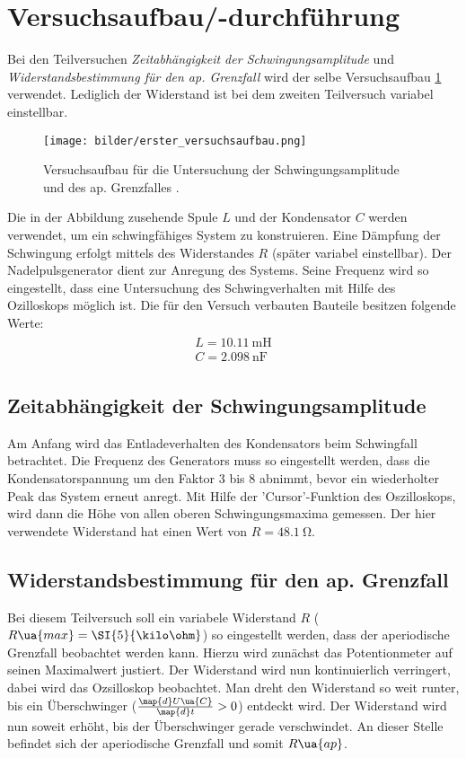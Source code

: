 \section{Versuchsaufbau/-durchführung}
Bei den Teilversuchen \emph{Zeitabhängigkeit der Schwingungsamplitude}
und \emph{Widerstandsbestimmung für den ap. Grenzfall} wird der selbe
Versuchsaufbau \ref{fig:aufbau_eins} verwendet. Lediglich der Widerstand ist bei dem
zweiten Teilversuch variabel einstellbar.
\begin{figure}
  \centering
  \texttt{[image: bilder/erster\_versuchsaufbau.png]}
  \caption{Versuchsaufbau für die Untersuchung der Schwingungsamplitude und des ap. Grenzfalles \cite{anleitung354}. }
  \label{fig:aufbau_eins}
\end{figure}
Die in der Abbildung zusehende Spule $L$ und der Kondensator $C$ werden verwendet, um
ein schwingfähiges System zu konstruieren. Eine Dämpfung der Schwingung
erfolgt mittels des Widerstandes $R$ (später variabel einstellbar).
Der Nadelpulsgenerator dient zur Anregung des Systems. Seine Frequenz wird so
eingestellt, dass eine Untersuchung des Schwingverhalten mit Hilfe des
Ozilloskops möglich ist. Die für den Versuch verbauten Bauteile besitzen folgende
Werte:
\begin{align}
  \label{eq:bauelemente_1}
  \begin{aligned}
    L=\SI{10.11}{\milli\henry}\\
    C=\SI{2.098}{\nano\farad}
  \end{aligned}
\end{align}
\subsection{Zeitabhängigkeit der Schwingungsamplitude}
Am Anfang wird das Entladeverhalten des Kondensators beim Schwingfall betrachtet.
Die Frequenz des Generators muss %
so eingestellt werden, dass die Kondensatorspannung um den Faktor $3$ bis $8$
abnimmt, bevor ein wiederholter Peak das System erneut anregt.
Mit Hilfe der 'Cursor'-Funktion des Oszilloskops, wird dann %
die Höhe von allen oberen Schwingungsmaxima gemessen.
Der hier verwendete Widerstand hat einen Wert von $R=\SI{48.1}{\ohm}$.
\subsection{Widerstandsbestimmung für den ap. Grenzfall}
Bei diesem Teilversuch soll ein variabele Widerstand $R$ ($R\ua{max}=\SI{5}{\kilo\ohm}$) so eingestellt werden,
dass der aperiodische Grenzfall beobachtet werden kann.
Hierzu wird zunächst das Potentionmeter auf seinen Maximalwert justiert.
Der Widerstand wird nun kontinuierlich verringert, dabei wird das %
Ozsilloskop beobachtet. Man dreht den Widerstand so weit runter, bis %
ein Überschwinger ($\frac{\map{d}U\ua{C}}{\map{d}t}>0$) entdeckt wird.
Der Widerstand wird nun soweit erhöht, bis der Überschwinger gerade verschwindet.
An dieser Stelle befindet sich der aperiodische Grenzfall und somit $R\ua{ap}$. %
